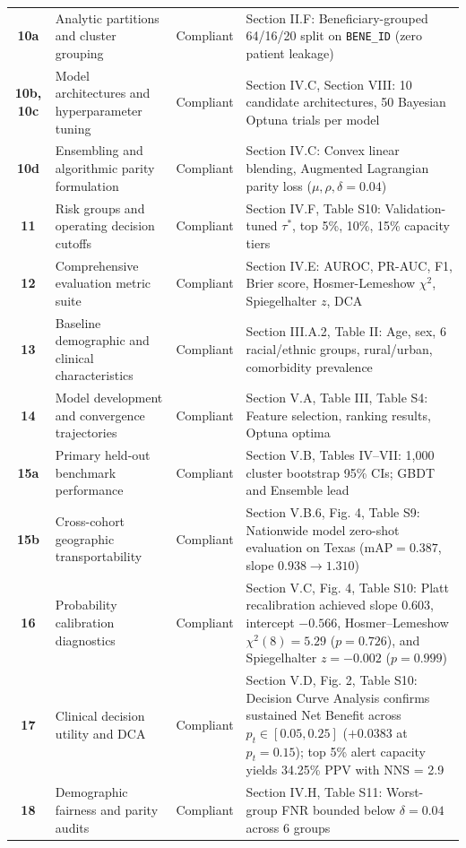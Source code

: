 \documentclass[10pt,journal]{IEEEtran}
\begin{document}
\begin{table}[!t]
\begin{tabular}{cp{}cp{}}
\textbf{10a} & Analytic partitions and cluster grouping & Compliant & Section II.F: Beneficiary-grouped 64/16/20 split on \texttt{BENE\_ID} (zero patient leakage) \\
\textbf{10b, 10c} & Model architectures and hyperparameter tuning & Compliant & Section IV.C, Section VIII: 10 candidate architectures, 50 Bayesian Optuna trials per model \\
\textbf{10d} & Ensembling and algorithmic parity formulation & Compliant & Section IV.C: Convex linear blending, Augmented Lagrangian parity loss ($\mu, \rho, \delta=0.04$) \\
\textbf{11} & Risk groups and operating decision cutoffs & Compliant & Section IV.F, Table S10: Validation-tuned $\tau^*$, top 5\%, 10\%, 15\% capacity tiers \\
\textbf{12} & Comprehensive evaluation metric suite & Compliant & Section IV.E: AUROC, PR-AUC, F1, Brier score, Hosmer-Lemeshow $\chi^2$, Spiegelhalter $z$, DCA \\
\textbf{13} & Baseline demographic and clinical characteristics & Compliant & Section III.A.2, Table II: Age, sex, 6 racial/ethnic groups, rural/urban, comorbidity prevalence \\
\textbf{14} & Model development and convergence trajectories & Compliant & Section V.A, Table III, Table S4: Feature selection, ranking results, Optuna optima \\
\textbf{15a} & Primary held-out benchmark performance & Compliant & Section V.B, Tables IV--VII: 1,000 cluster bootstrap 95\% CIs; GBDT and Ensemble lead \\
\textbf{15b} & Cross-cohort geographic transportability & Compliant & Section V.B.6, Fig. 4, Table S9: Nationwide model zero-shot evaluation on Texas ($\text{mAP} = 0.387$, slope $0.938 \to 1.310$) \\
\textbf{16} & Probability calibration diagnostics & Compliant & Section V.C, Fig. 4, Table S10: Platt recalibration achieved slope $0.603$, intercept $-0.566$, Hosmer--Lemeshow $\chi^2(8) = 5.29$ ($p = 0.726$), and Spiegelhalter $z = -0.002$ ($p = 0.999$) \\
\textbf{17} & Clinical decision utility and DCA & Compliant & Section V.D, Fig. 2, Table S10: Decision Curve Analysis confirms sustained Net Benefit across $p_t \in [0.05, 0.25]$ ($+0.0383$ at $p_t = 0.15$); top 5\% alert capacity yields 34.25\% PPV with NNS = 2.9 \\
\textbf{18} & Demographic fairness and parity audits & Compliant & Section IV.H, Table S11: Worst-group FNR bounded below $\delta=0.04$ across 6 groups \\

\end{tabular}
\end{table}
\end{document}
